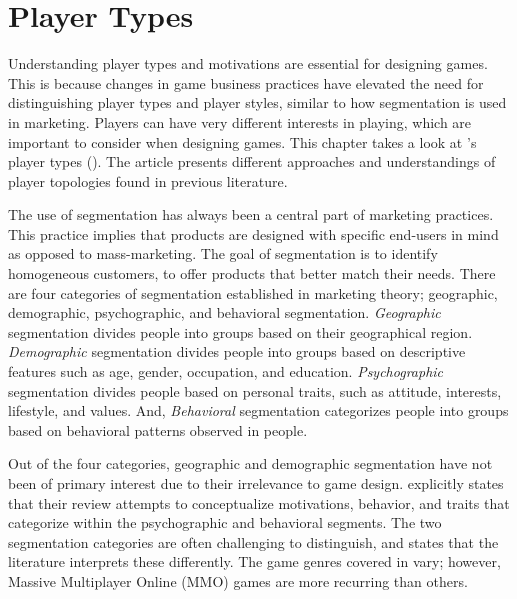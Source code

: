 \section{Player Types}
\label{chap:player_types}

Understanding player types and motivations are essential for designing games. This is because changes in game business practices have elevated the need for distinguishing player types and player styles, similar to how segmentation is used in marketing. Players can have very different interests in playing, which are important to consider when designing games. This chapter takes a look at \citeauthor{hamari_player_2014}'s player types (\citeyear{hamari_player_2014}). The article presents different approaches and understandings of player topologies found in previous literature. 

The use of segmentation has always been a central part of marketing practices. This practice implies that products are designed with specific end-users in mind as opposed to mass-marketing. The goal of segmentation is to identify homogeneous customers, to offer products that better match their needs. There are four categories of segmentation established in marketing theory; geographic, demographic, psychographic, and behavioral segmentation. \textit{Geographic} segmentation divides people into groups based on their geographical region. \textit{Demographic} segmentation divides people into groups based on descriptive features such as age, gender, occupation, and education. \textit{Psychographic} segmentation divides people based on personal traits, such as attitude, interests, lifestyle, and values. And, \textit{Behavioral} segmentation categorizes people into groups based on behavioral patterns observed in people.

Out of the four categories, geographic and demographic segmentation have not been of primary interest due to their irrelevance to game design. \citet{hamari_player_2014} explicitly states that their review attempts to conceptualize motivations, behavior, and traits that categorize within the psychographic and behavioral segments. The two segmentation categories are often challenging to distinguish, and \citet{hamari_player_2014} states that the literature interprets these differently. The game genres covered in \citet{hamari_player_2014} vary; however, Massive Multiplayer Online (MMO) games are more recurring than others.

